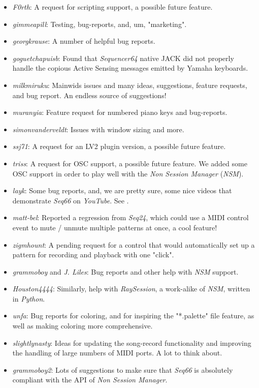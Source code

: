    \begin{itemize}
      \item \textsl{F0rth}:
         A request for scripting support, a possible future feature.
      \item \textsl{gimmeapill}:
         Testing, bug-reports, and, um, "marketing".
      \item \textsl{georgkrause}:
         A number of helpful bug reports.
      \item \textsl{goguetchapuisb}:
         Found that \textsl{Sequencer64} native JACK did not properly handle
         the copious Active Sensing messages emitted by Yamaha keyboards.
      \item \textsl{milkmiruku}:
         Mainwids issues and many ideas, suggestions, feature requests, and bug
         report.  An endless source of suggestions!
      \item \textsl{muranyia}:
         Feature request for numbered piano keys and bug-reports.
      \item \textsl{simonvanderveldt}:
         Issues with window sizing and more.
      \item \textsl{ssj71}:
         A request for an LV2 plugin version, a possible future feature.
      \item \textsl{triss}:
         A request for OSC support, a possible future feature.  We added some
         OSC support in order to play well with the \textsl{Non Session
         Manager} (\textsl{NSM}).
      \item \textsl{layk}:
         Some bug reports, and, we are pretty sure, some nice videos that
         demonstrate \textsl{Seq66} on \textsl{YouTube}.  See
         \cite{layk}.
      \item \textsl{matt-bel}:
         Reported a regression from \textsl{Seq24}, which could use
         a MIDI control event to mute / unmute multiple patterns at once,
         a cool feature!
      \item \textsl{zigmhount}:
         A pending request for a control that would automatically set up a
         pattern for recording and playback with one "click".
      \item \textsl{grammoboy} and \textsl{J. Liles}:
         Bug reports and other help with \textsl{NSM} support.
      \item \textsl{Houston4444}:
         Similarly, help with \textsl{RaySession}, a work-alike of
         \textsl{NSM}, written in \textsl{Python}.
      \item \textsl{unfa}:
         Bug reports for coloring, and for inspiring the "*.palette" file
         feature, as well as making coloring more comprehensive.
      \item \textsl{slightlynasty}:
         Ideas for updating the song-record functionality and improving the
         handling of large numbers of MIDI ports.
         A lot to think about.
      \item \textsl{grammoboy2}:
         Lots of suggestions to make sure that \textsl{Seq66} is absolutely
         compliant with the API of \textsl{Non Session Manager}.
   \end{itemize}


